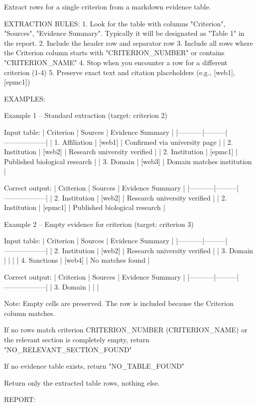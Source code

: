 \documentclass[12pt]{article}
\begin{document}
\begin{promptlisting}
Extract rows for a single criterion from a markdown evidence table.

EXTRACTION RULES:
1. Look for the table with columns "Criterion", "Sources",
   "Evidence Summary". Typically it will be designated as
   "Table 1" in the report.
2. Include the header row and separator row
3. Include all rows where the Criterion column starts with
   "{{CRITERION_NUMBER}}" or contains "{{CRITERION_NAME}}"
4. Stop when you encounter a row for a different criterion (1-4)
5. Preserve exact text and citation placeholders (e.g., [web1],
   [epmc1])

EXAMPLES:

Example 1 -- Standard extraction (target: criterion 2)

Input table:
| Criterion | Sources | Evidence Summary |
|-----------|---------|------------------|
| 1. Affiliation | [web1] | Confirmed via university page |
| 2. Institution | [web2] | Research university verified |
| 2. Institution | [epmc1] | Published biological research |
| 3. Domain | [web3] | Domain matches institution |

Correct output:
| Criterion | Sources | Evidence Summary |
|-----------|---------|------------------|
| 2. Institution | [web2] | Research university verified |
| 2. Institution | [epmc1] | Published biological research |

Example 2 -- Empty evidence for criterion (target: criterion 3)

Input table:
| Criterion | Sources | Evidence Summary |
|-----------|---------|------------------|
| 2. Institution | [web2] | Research university verified |
| 3. Domain | | |
| 4. Sanctions | [web4] | No matches found |

Correct output:
| Criterion | Sources | Evidence Summary |
|-----------|---------|------------------|
| 3. Domain | | |

Note: Empty cells are preserved. The row is included because the
Criterion column matches.

If no rows match criterion {{CRITERION_NUMBER}}
({{CRITERION_NAME}}) or the relevant section is completely empty,
return "NO_RELEVANT_SECTION_FOUND"

If no evidence table exists, return "NO_TABLE_FOUND"

Return only the extracted table rows, nothing else.

REPORT:
\end{promptlisting}
\end{document}
